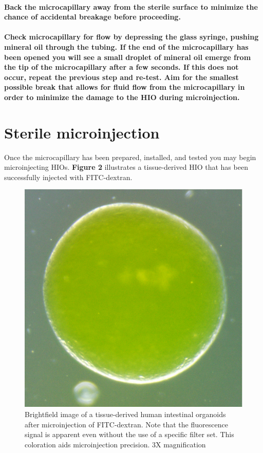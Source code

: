 \documentclass[11pt]{article}
\begin{document}
\paragraph{{\sffamily } Back the microcapillary away from the sterile surface to minimize the chance of accidental breakage before proceeding.}
\label{sec:orgheadline38}
\paragraph{{\sffamily } Check microcapillary for flow by depressing the glass syringe, pushing mineral oil through the tubing. If the end of the microcapillary has been opened you will see a small droplet of mineral oil emerge from the tip of the microcapillary after a few seconds. If this does not occur, repeat the previous step and re-test. Aim for the smallest possible break that allows for fluid flow from the microcapillary in order to minimize the damage to the HIO during microinjection.}
\label{sec:orgheadline39}



\section{{\sffamily } Sterile microinjection}
\label{sec:orgheadline57}
Once the microcapillary has been prepared, installed, and tested you may begin microinjecting HIOs. \textbf{Figure 2} illustrates a tissue-derived HIO that has been successfully injected with FITC-dextran.\\
\begin{figure}
\centering
\includegraphics[width=0.35\linewidth]{./img/figure3.pdf}
\caption{Brightfield image of a tissue-derived human intestinal organoids after microinjection of FITC-dextran. Note that the fluorescence signal is apparent even without the use of a specific filter set. This coloration aids microinjection precision. 3X magnification}
\end{figure}
\end{document}
